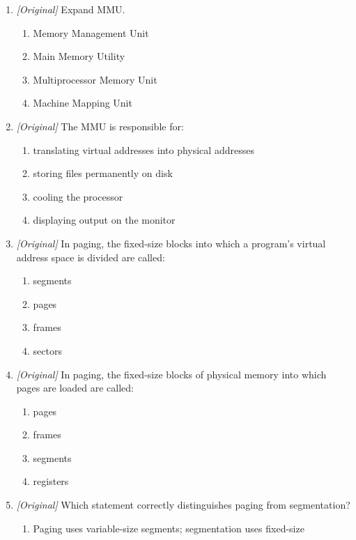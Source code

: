 \documentclass[11pt]{article}
\begin{document}
\begin{enumerate}[label=\textbf{Q\arabic*.}, leftmargin=*]
\begin{enumerate}[label=\Alph*.]
    \item replace the CPU with a faster unit
    \item store the firmware permanently
  \end{enumerate}
\item \textit{[Original]} Expand MMU.
  \begin{enumerate}[label=\Alph*.]
    \item Memory Management Unit
    \item Main Memory Utility
    \item Multiprocessor Memory Unit
    \item Machine Mapping Unit
  \end{enumerate}
\item \textit{[Original]} The MMU is responsible for:
  \begin{enumerate}[label=\Alph*.]
    \item translating virtual addresses into physical addresses
    \item storing files permanently on disk
    \item cooling the processor
    \item displaying output on the monitor
  \end{enumerate}
\item \textit{[Original]} In paging, the fixed-size blocks into which a
  program's virtual address space is divided are called:
  \begin{enumerate}[label=\Alph*.]
    \item segments
    \item pages
    \item frames
    \item sectors
  \end{enumerate}
\item \textit{[Original]} In paging, the fixed-size blocks of physical memory
  into which pages are loaded are called:
  \begin{enumerate}[label=\Alph*.]
    \item pages
    \item frames
    \item segments
    \item registers
  \end{enumerate}
\item \textit{[Original]} Which statement correctly distinguishes paging from
  segmentation?
  \begin{enumerate}[label=\Alph*.]
    \item Paging uses variable-size segments; segmentation uses fixed-size

\end{enumerate}
\end{enumerate}
\end{document}
